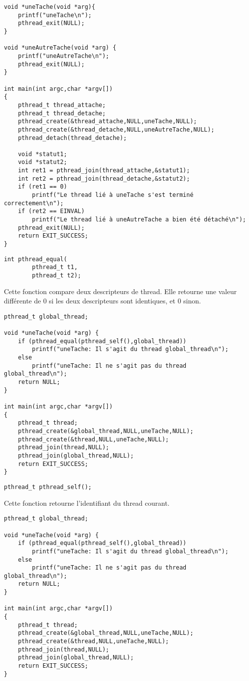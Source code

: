 \begin{lstlisting}[frame=trBL]
void *uneTache(void *arg){
	printf("uneTache\n");
	pthread_exit(NULL);
}

void *uneAutreTache(void *arg) {
	printf("uneAutreTache\n");
	pthread_exit(NULL);
}

int main(int argc,char *argv[])
{
	pthread_t thread_attache;
	pthread_t thread_detache;
	pthread_create(&thread_attache,NULL,uneTache,NULL);
	pthread_create(&thread_detache,NULL,uneAutreTache,NULL);
	pthread_detach(thread_detache);

	void *statut1;
	void *statut2;
	int ret1 = pthread_join(thread_attache,&statut1);
	int ret2 = pthread_join(thread_detache,&statut2);
	if (ret1 == 0)
		printf("Le thread lié à uneTache s'est terminé correctement\n");
	if (ret2 == EINVAL)
		printf("Le thread lié à uneAutreTache a bien été détaché\n");
	pthread_exit(NULL);
	return EXIT_SUCCESS;
}
\end{lstlisting}


\label{func:pthread_equal}

\begin{lstlisting}
int pthread_equal(
		pthread_t t1,
		pthread_t t2);
\end{lstlisting}
Cette fonction compare deux descripteurs de thread. Elle retourne une valeur différente de 0 si les deux descripteurs sont identiques, et 0 sinon.

\begin{lstlisting}[frame=trBL]
pthread_t global_thread;

void *uneTache(void *arg) {
	if (pthread_equal(pthread_self(),global_thread))
		printf("uneTache: Il s'agit du thread global_thread\n");
	else
		printf("uneTache: Il ne s'agit pas du thread global_thread\n");
	return NULL;
}

int main(int argc,char *argv[])
{
	pthread_t thread;
	pthread_create(&global_thread,NULL,uneTache,NULL);
	pthread_create(&thread,NULL,uneTache,NULL);
	pthread_join(thread,NULL);
	pthread_join(global_thread,NULL);
	return EXIT_SUCCESS;
}
\end{lstlisting}

\label{func:pthread_self}

\begin{lstlisting}
pthread_t pthread_self();
\end{lstlisting}
Cette fonction retourne l'identifiant du thread courant.
\begin{lstlisting}[frame=trBL]
pthread_t global_thread;

void *uneTache(void *arg) {
	if (pthread_equal(pthread_self(),global_thread))
		printf("uneTache: Il s'agit du thread global_thread\n");
	else
		printf("uneTache: Il ne s'agit pas du thread global_thread\n");
	return NULL;
}

int main(int argc,char *argv[])
{
	pthread_t thread;
	pthread_create(&global_thread,NULL,uneTache,NULL);
	pthread_create(&thread,NULL,uneTache,NULL);
	pthread_join(thread,NULL);
	pthread_join(global_thread,NULL);
	return EXIT_SUCCESS;
}
\end{lstlisting}


